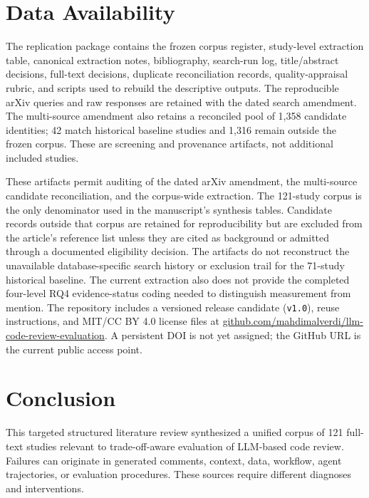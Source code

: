 \documentclass[10pt]{article}
\begin{document}

\section{Data Availability}

The replication package contains the frozen corpus register, study-level extraction table, canonical extraction notes, bibliography, search-run log, title/abstract decisions, full-text decisions, duplicate reconciliation records, quality-appraisal rubric, and scripts used to rebuild the descriptive outputs. The reproducible arXiv queries and raw responses are retained with the dated search amendment. The multi-source amendment also retains a reconciled pool of 1,358 candidate identities; 42 match historical baseline studies and 1,316 remain outside the frozen corpus. These are screening and provenance artifacts, not additional included studies.

These artifacts permit auditing of the dated arXiv amendment, the multi-source candidate reconciliation, and the corpus-wide extraction. The 121-study corpus is the only denominator used in the manuscript's synthesis tables. Candidate records outside that corpus are retained for reproducibility but are excluded from the article's reference list unless they are cited as background or admitted through a documented eligibility decision. The artifacts do not reconstruct the unavailable database-specific search history or exclusion trail for the 71-study historical baseline. The current extraction also does not provide the completed four-level RQ4 evidence-status coding needed to distinguish measurement from mention. The repository includes a versioned release candidate (\texttt{v1.0}), reuse instructions, and MIT/CC BY 4.0 license files at \href{https://github.com/mahdimalverdi/llm-code-review-evaluation}{github.com/mahdimalverdi/llm-code-review-evaluation}. A persistent DOI is not yet assigned; the GitHub URL is the current public access point.




\section{Conclusion}

This targeted structured literature review synthesized a unified corpus of 121 full-text studies relevant to trade-off-aware evaluation of LLM-based code review. Failures can originate in generated comments, context, data, workflow, agent trajectories, or evaluation procedures. These sources require different diagnoses and interventions.
\end{document}
